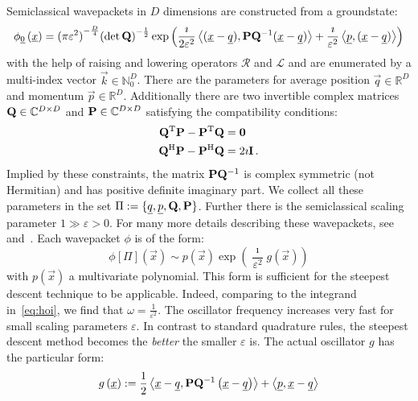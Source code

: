 \documentclass[a4paper,10pt]{article}
\begin{document}
Semiclassical wavepackets in $D$ dimensions are constructed from a groundstate:
\begin{align*}
  \phi_{\underline{0}}\left(\underline{x}\right)
  =
  {(\pi\varepsilon^2)}^{-\frac{D}{4}} {(\det\mathbf{Q})}^{-\frac{1}{2}}
  \exp \left( \frac{\imath}{2\varepsilon^2}
  \left\langle (\underline{x}-\underline{q}) , \mathbf{P}\mathbf{Q}{}^{-1}(\underline{x}-\underline{q}) \right\rangle
  + \frac{\imath}{\varepsilon^2} \left\langle \underline{p} , (\underline{x}-\underline{q}) \right\rangle
  \right)
\end{align*}
with the help of raising and lowering operators $\mathcal{R}$ and $\mathcal{L}$
and are enumerated by a multi-index vector $\vec{k} \in \mathbb{N}_0^D$.
There are the parameters for average position $\vec{q} \in \mathbb{R}^D$
and momentum $\vec{p} \in \mathbb{R}^D$. Additionally there are two invertible
complex matrices $\mathbf{Q} \in \mathbb{C}^{D \times D}$ and $\mathbf{P} \in \mathbb{C}^{D \times D}$
satisfying the compatibility conditions:
\begin{align}
  \mathbf{Q}{}^{\textnormal{T}}\mathbf{P} - \mathbf{P}{}^{\textnormal{T}}\mathbf{Q} &= \mathbf{0} \\
  \mathbf{Q}{}^{\textnormal{H}}\mathbf{P} - \mathbf{P}{}^{\textnormal{H}}\mathbf{Q} &= 2\imath\mathbf{I} \,.
\end{align}
Implied by these constraints, the matrix $\mathbf{P}\mathbf{Q}{}^{-1}$ is complex symmetric
(not Hermitian) and has positive definite imaginary part.
We collect all these parameters in the set $\Pi := \{\underline{q}, \underline{p}, \mathbf{Q}, \mathbf{P}\}$.
Further there is the semiclassical scaling parameter $1 \gg \varepsilon > 0$.
For many more details describing these wavepackets, see~\cite{H_ladder_operators}
and~\cite{B_master_thesis}.
Each wavepacket $\phi$ is of the form:
\begin{equation}
  \phi[\Pi](\vec{x}) \sim p\left(\vec{x}\right)
                          \exp\left(\frac{\imath}{\varepsilon^2} g\left(\vec{x}\right)\right)
\end{equation}
with $p(\vec{x})$ a multivariate polynomial.
This form is sufficient for the steepest descent technique to be applicable.
Indeed, comparing to the integrand in~\eqref{eq:hoi},
we find that $\omega = \frac{1}{\varepsilon^2}$. The oscillator
frequency increases very fast for small scaling parameters $\varepsilon$.
In contrast to standard quadrature rules, the steepest descent method becomes
the \emph{better} the smaller $\varepsilon$ is. The actual oscillator $g$ has the particular form:
\begin{equation}
  g\left(\underline{x}\right)
  :=
  \frac{1}{2} \left\langle \underline{x}-\underline{q} , \mathbf{P}\mathbf{Q}{}^{-1} \left(\underline{x}-\underline{q}\right) \right\rangle
  +
  \left\langle \underline{p} , \underline{x}-\underline{q} \right\rangle
\end{equation}
\end{document}
